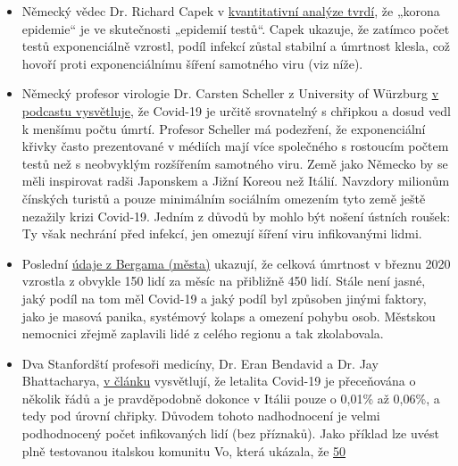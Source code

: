 \begin{itemize}
\tightlist
\item
  Německý vědec Dr. Richard Capek v
  \href{https://coronadaten.wordpress.com/}{kvantitativní analýze
  tvrdí}, že „korona epidemie`` je ve skutečnosti „epidemií testů``.
  Capek ukazuje, že zatímco počet testů exponenciálně vzrostl, podíl
  infekcí zůstal stabilní a úmrtnost klesla, což hovoří proti
  exponenciálnímu šíření samotného viru (viz níže).
\item
  Německý profesor virologie Dr. Carsten Scheller z University of
  Würzburg \href{https://www.youtube.com/watch?v=w-uub0urNfw}{v podcastu
  vysvětluje}, že Covid-19 je určitě srovnatelný s chřipkou a dosud vedl
  k menšímu počtu úmrtí. Profesor Scheller má podezření, že
  exponenciální křivky často prezentované v médiích mají více společného
  s rostoucím počtem testů než s neobvyklým rozšířením samotného viru.
  Země jako Německo by se měli inspirovat radši Japonskem a Jižní Koreou
  než Itálií. Navzdory milionům čínských turistů a pouze minimálním
  sociálním omezením tyto země ještě nezažily krizi Covid-19. Jedním z
  důvodů by mohlo být nošení ústních roušek: Ty však nechrání před
  infekcí, jen omezují šíření viru infikovanými lidmi.
\item
  Poslední
  \href{https://www.ecodibergamo.it/stories/bergamo-citta/a-bergamo-decessi-4-volte-oltre-la-medialeco-lancia-unindagine-nei-comuni_1346651_11/}{údaje
  z Bergama (města)} ukazují, že celková úmrtnost v březnu 2020 vzrostla
  z obvykle 150 lidí za měsíc na přibližně 450 lidí. Stále není jasné,
  jaký podíl na tom měl Covid-19 a jaký podíl byl způsoben jinými
  faktory, jako je masová panika, systémový kolaps a omezení pohybu
  osob. Městskou nemocnici zřejmě zaplavili lidé z celého regionu a tak
  zkolabovala.
\item
  Dva Stanfordští profesoři medicíny, Dr. Eran Bendavid a Dr. Jay
  Bhattacharya,
  \href{https://web.archive.org/web/20200325103650/https:/www.wsj.com/articles/is-the-coronavirus-as-deadly-as-they-say-11585088464}{v
  článku} vysvětlují, že letalita Covid-19 je přeceňována o několik řádů
  a je pravděpodobně dokonce v Itálii pouze o 0,01\% až 0,06\%, a tedy
  pod úrovní chřipky. Důvodem tohoto nadhodnocení je velmi podhodnocený
  počet infikovaných lidí (bez příznaků). Jako příklad lze uvést plně
  testovanou italskou komunitu Vo, která ukázala, že
  \href{https://www.repubblica.it/salute/medicina-e-ricerca/2020/03/16/news/coronavirus_studio_il_50-75_dei_casi_a_vo_sono_asintomatici_e_molto_contagiosi-251474302/}{50
}
\end{itemize}
